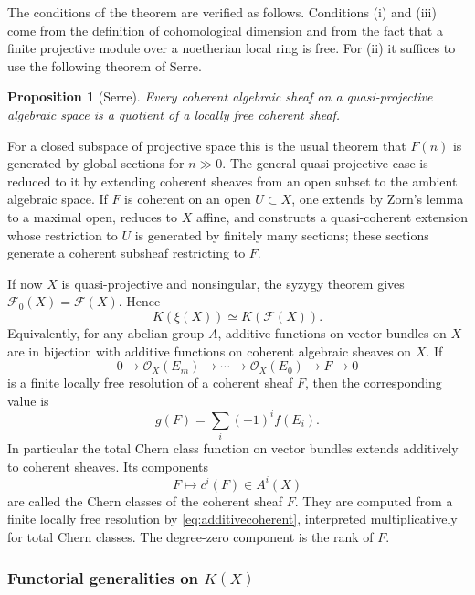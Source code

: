 \documentclass[14pt]{extarticle}
\newcommand{\cO}{\mathcal O}
\newcommand{\cF}{\mathcal F}
\newtheorem*{proposition*}{Proposition}
\begin{document}
The conditions of the theorem are verified as follows. Conditions (i) and (iii) come from the definition of cohomological dimension and from the fact that a finite projective module over a noetherian local ring is free. For (ii) it suffices to use the following theorem of Serre.

\begin{proposition*}[Serre]
Every coherent algebraic sheaf on a quasi-projective algebraic space is a quotient of a locally free coherent sheaf.
\end{proposition*}

For a closed subspace of projective space this is the usual theorem that $F(n)$ is generated by global sections for $n\gg0$. The general quasi-projective case is reduced to it by extending coherent sheaves from an open subset to the ambient algebraic space. If $F$ is coherent on an open $U\subset X$, one extends by Zorn's lemma to a maximal open, reduces to $X$ affine, and constructs a quasi-coherent extension whose restriction to $U$ is generated by finitely many sections; these sections generate a coherent subsheaf restricting to $F$.

If now $X$ is quasi-projective and nonsingular, the syzygy theorem gives $\cF_0(X)=\cF(X)$. Hence
\begin{equation}\label{eq:Kvectorcoherent}
   K(\xi(X))\simeq K(\cF(X)).
\end{equation}
Equivalently, for any abelian group $A$, additive functions on vector bundles on $X$ are in bijection with additive functions on coherent algebraic sheaves on $X$. If
\[
   0\to \cO_X(E_m)\to\cdots\to\cO_X(E_0)\to F\to0
\]
is a finite locally free resolution of a coherent sheaf $F$, then the corresponding value is
\begin{equation}\label{eq:additivecoherent}
   g(F)=\sum_i(-1)^if(E_i).
\end{equation}
In particular the total Chern class function on vector bundles extends additively to coherent sheaves. Its components
\[
   F\longmapsto c^i(F)\in A^i(X)
\]
are called the Chern classes of the coherent sheaf $F$. They are computed from a finite locally free resolution by \eqref{eq:additivecoherent}, interpreted multiplicatively for total Chern classes. The degree-zero component is the rank of $F$.

\subsubsection{Functorial generalities on $K(X)$}
\end{document}
